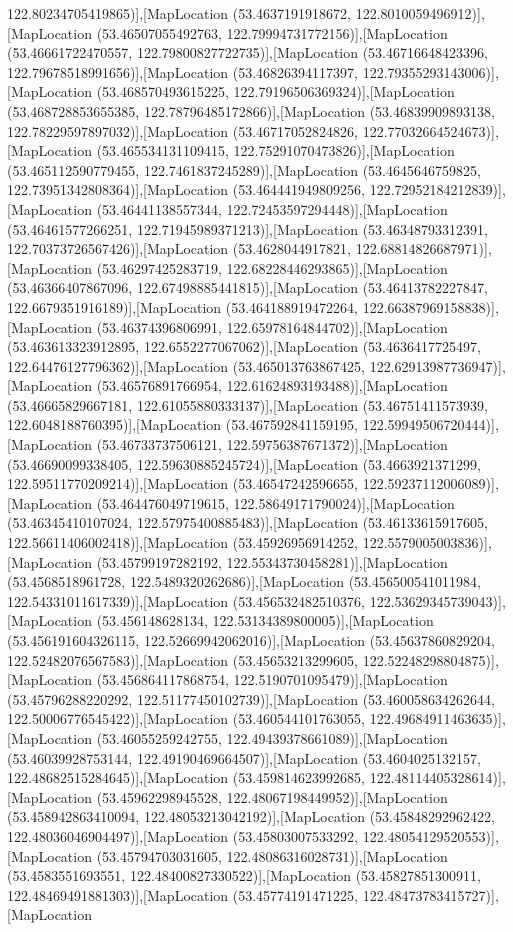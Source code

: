 122.80234705419865)],[MapLocation (53.4637191918672, 122.8010059496912)],[MapLocation (53.46507055492763, 122.79994731772156)],[MapLocation (53.46661722470557, 122.79800827722735)],[MapLocation (53.46716648423396, 122.79678518991656)],[MapLocation (53.46826394117397, 122.79355293143006)],[MapLocation (53.468570493615225, 122.79196506369324)],[MapLocation (53.468728853655385, 122.78796485172866)],[MapLocation (53.46839909893138, 122.78229597897032)],[MapLocation (53.46717052824826, 122.77032664524673)],[MapLocation (53.465534131109415, 122.75291070473826)],[MapLocation (53.465112590779455, 122.7461837245289)],[MapLocation (53.4645646759825, 122.73951342808364)],[MapLocation (53.464441949809256, 122.72952184212839)],[MapLocation (53.46441138557344, 122.72453597294448)],[MapLocation (53.46461577266251, 122.71945989371213)],[MapLocation (53.46348793312391, 122.70373726567426)],[MapLocation (53.4628044917821, 122.68814826687971)],[MapLocation (53.46297425283719, 122.68228446293865)],[MapLocation (53.46366407867096, 122.67498885441815)],[MapLocation (53.46413782227847, 122.6679351916189)],[MapLocation (53.464188919472264, 122.66387969158838)],[MapLocation (53.46374396806991, 122.65978164844702)],[MapLocation (53.463613323912895, 122.6552277067062)],[MapLocation (53.4636417725497, 122.64476127796362)],[MapLocation (53.465013763867425, 122.62913987736947)],[MapLocation (53.46576891766954, 122.61624893193488)],[MapLocation (53.46665829667181, 122.61055880333137)],[MapLocation (53.46751411573939, 122.6048188760395)],[MapLocation (53.467592841159195, 122.59949506720444)],[MapLocation (53.46733737506121, 122.59756387671372)],[MapLocation (53.46690099338405, 122.59630885245724)],[MapLocation (53.4663921371299, 122.59511770209214)],[MapLocation (53.46547242596655, 122.59237112006089)],[MapLocation (53.464476049719615, 122.58649171790024)],[MapLocation (53.46345410107024, 122.57975400885483)],[MapLocation (53.46133615917605, 122.56611406002418)],[MapLocation (53.45926956914252, 122.5579005003836)],[MapLocation (53.45799197282192, 122.55343730458281)],[MapLocation (53.4568518961728, 122.5489320262686)],[MapLocation (53.456500541011984, 122.54331011617339)],[MapLocation (53.456532482510376, 122.53629345739043)],[MapLocation (53.456148628134, 122.53134389800005)],[MapLocation (53.456191604326115, 122.52669942062016)],[MapLocation (53.45637860829204, 122.52482076567583)],[MapLocation (53.45653213299605, 122.52248298804875)],[MapLocation (53.456864117868754, 122.5190701095479)],[MapLocation (53.45796288220292, 122.51177450102739)],[MapLocation (53.460058634262644, 122.50006776545422)],[MapLocation (53.460544101763055, 122.49684911463635)],[MapLocation (53.46055259242755, 122.49439378661089)],[MapLocation (53.46039928753144, 122.49190469664507)],[MapLocation (53.4604025132157, 122.48682515284645)],[MapLocation (53.459814623992685, 122.48114405328614)],[MapLocation (53.45962298945528, 122.48067198449952)],[MapLocation (53.458942863410094, 122.48053213042192)],[MapLocation (53.45848292962422, 122.48036046904497)],[MapLocation (53.45803007533292, 122.48054129520553)],[MapLocation (53.45794703031605, 122.48086316028731)],[MapLocation (53.4583551693551, 122.48400827330522)],[MapLocation (53.45827851300911, 122.48469491881303)],[MapLocation (53.45774191471225, 122.48473783415727)],[MapLocation 